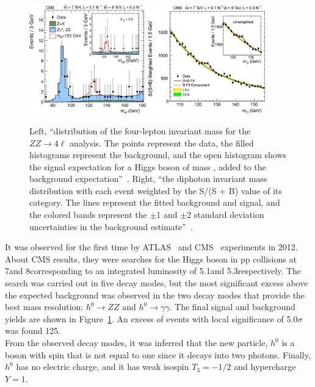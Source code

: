 \begin{figure}[h!]
\centering
\includegraphics[width=0.45\textwidth]{Figures/c1/higgs_1.jpeg}
\includegraphics[width=0.45\textwidth]{Figures/c1/higgs_2.jpeg}
\caption{Left, ``distribution of the four-lepton invariant mass for the $ZZ\rightarrow 4\ell$ analysis. The points represent the data, the filled histograms represent the background, and the open histogram shows the signal expectation for a Higgs boson of mass , added to the background expectation''~\cite{201230}. Right, ``the diphoton invariant mass distribution with each event weighted by the S/(S + B) value of its category. The lines represent the fitted background and signal, and the colored bands represent the $\pm$1 and $\pm$2 standard deviation uncertainties in the background estimate''~\cite{201230}.}
\label{fig:higgmass}
\end{figure}

It was observed for the first time by ATLAS~\cite{20121} and CMS~\cite{201230} experiments in 2012.
About CMS results, they were searches for the Higgs boson in pp collisions at 7\TeV and 8\TeV corresponding to an integrated luminosity of 5.1\fbinv and 5.3\fbinv respectively. The search was carried out in five decay modes, but the most significant excess above the expected background was observed in the two decay modes that provide the best mass resolution: $h^{0} \rightarrow ZZ$ and $h^{0} \rightarrow \gamma \gamma$. The final signal and background yields are shown in Figure~\ref{fig:higgmass}. An excess of events with local significance of 5.0$\sigma$ was found 125\GeV.\\
From the observed decay modes, it was inferred that the new particle, $h^{0}$ is a boson with spin that is not equal to one since it decays into two photons. Finally, $h^0$ has no electric charge, and it has weak isospin $T_3=-1/2$ and hypercharge $Y=1$.

